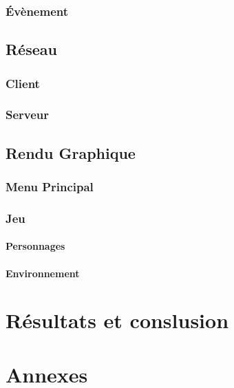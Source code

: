 \documentclass[11pt]{article}
\begin{document}
            \subsubsection{Évènement}
        \subsection{Réseau}
            \subsubsection{Client}
            \subsubsection{Serveur}
        \subsection{Rendu Graphique}
            \subsubsection{Menu Principal}
            \subsubsection{Jeu}
                \paragraph{Personnages}
                \paragraph{Environnement}
    
    \section{Résultats et conslusion}
    \section{Annexes}
\end{document}
